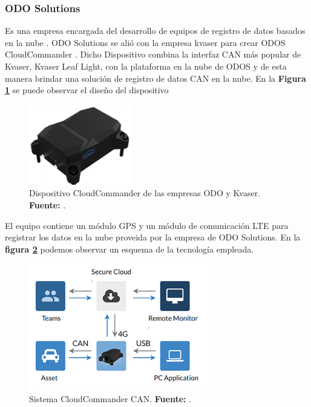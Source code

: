 \subsubsection{ODO Solutions}
Es una empresa encargada del desarrollo de equipos de registro de datos basados en la nube \cite{cite_odo_c3}.  ODO Solutions se alió con la empresa kvaser para crear ODOS CloudCommander \cite{cite_commander_c3}. Dicho Dispositivo combina la  interfaz CAN más popular de Kvaser, Kvaser Leaf Light, con la plataforma en la nube de ODOS y de esta manera  brindar una solución de registro de datos  CAN en la nube. En la \textbf{Figura \ref{fig_commander_c3}} se puede observar el diseño del dispositivo

\begin{figure}[H]
	\centering
	\includegraphics[width=0.4\textwidth]{./Cap3imagen/TCU.png}
	\caption[Dispositivo CloudCommander CAN.]{Dispositivo CloudCommander de las empresas ODO y Kvaser.\textbf{ Fuente:} \cite{cite_commander_c3}.}
	\label{fig_commander_c3} %
\end{figure}


El equipo contiene un módulo GPS y un módulo de comunicación LTE para registrar los datos en la nube proveida por la empresa de ODO Solutions. En la \textbf{figura \ref{fig_commanderSystem_c3}} podemos observar un esquema de la tecnología empleada.

\begin{figure}[H]
	\centering
	\includegraphics[width=0.7\textwidth]{./Cap3imagen/system-overview-2.png}
	\caption[Sistema CloudCommander CAN.]{Sistema CloudCommander CAN.\textbf{ Fuente:} \cite{cite_commander_c3}.}
	\label{fig_commanderSystem_c3} %
\end{figure}

